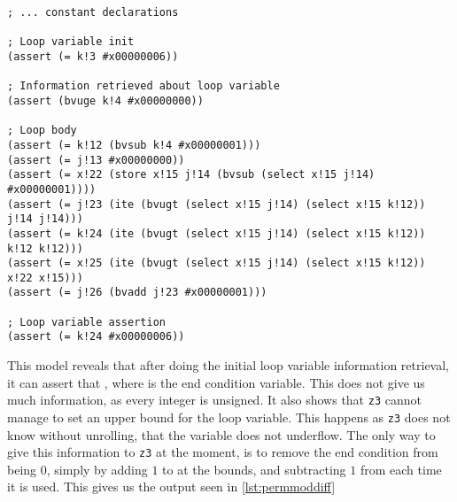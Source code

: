 \begin{lstlisting}[label={lst:z3ModelEncode}]
; ... constant declarations

; Loop variable init
(assert (= k!3 #x00000006))

; Information retrieved about loop variable
(assert (bvuge k!4 #x00000000))

; Loop body
(assert (= k!12 (bvsub k!4 #x00000001)))
(assert (= j!13 #x00000000))
(assert (= x!22 (store x!15 j!14 (bvsub (select x!15 j!14) #x00000001))))
(assert (= j!23 (ite (bvugt (select x!15 j!14) (select x!15 k!12)) j!14 j!14)))
(assert (= k!24 (ite (bvugt (select x!15 j!14) (select x!15 k!12)) k!12 k!12)))
(assert (= x!25 (ite (bvugt (select x!15 j!14) (select x!15 k!12)) x!22 x!15)))
(assert (= j!26 (bvadd j!23 #x00000001)))

; Loop variable assertion
(assert (= k!24 #x00000006))
\end{lstlisting}
\noindent
This model reveals that after doing the initial loop variable information retrieval, it can
assert that , where  is the end condition
variable. This does not give us much information, as every integer is unsigned. It also shows that
\texttt{z3} cannot manage to set an upper bound for the loop variable. This happens as
\texttt{z3} does not know without unrolling, that the variable does not underflow.
The only way to give this information to \texttt{z3} at the moment, is to remove the end condition
from being $0$, simply by adding $1$ to  at the bounds, and subtracting $1$ from 
each time it is used. This gives us the  output seen in \autoref{lst:permmoddiff}

